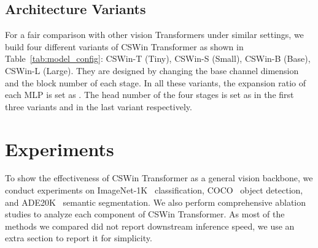 \documentclass[10pt,twocolumn,letterpaper]{article}
\newcommand{\Tref}[1]{Table~\ref{#1}}
\begin{document}
\begin{table}
\begin{center}
\small
{}
\vspace{-3mm}
\caption{Detailed configurations of different variants of CSWin Transformer. The FLOPs are calculated with  input.}
\vspace{-10mm}
\label{tab:model_config}
\end{center}
\end{table}

\subsection{Architecture Variants}
For a fair comparison with other vision Transformers under similar settings, we build four different variants of CSWin Transformer as shown in \Tref{tab:model_config}: CSWin-T (Tiny), CSWin-S (Small), CSWin-B (Base), CSWin-L (Large). They are designed by changing the base channel dimension  and the block number of each stage. In all these variants, the expansion ratio of each MLP is  set as .  The head number of the four stages is set as  in the first three variants and  in the last variant respectively.

\vspace{-1mm}
\section{Experiments}
\vspace{-1mm}
\label{sec:experiment}
To show the effectiveness of CSWin Transformer as a general vision backbone, we conduct experiments on ImageNet-1K~\cite{deng2009imagenet} classification, COCO~\cite{lin2014microsoftcoco} object detection, and ADE20K~\cite{zhou2017scene} semantic segmentation. We also perform comprehensive ablation studies to analyze each component of CSWin Transformer. As most of the methods we compared did not report downstream inference speed, we use an extra section to report it for simplicity.
\end{document}
